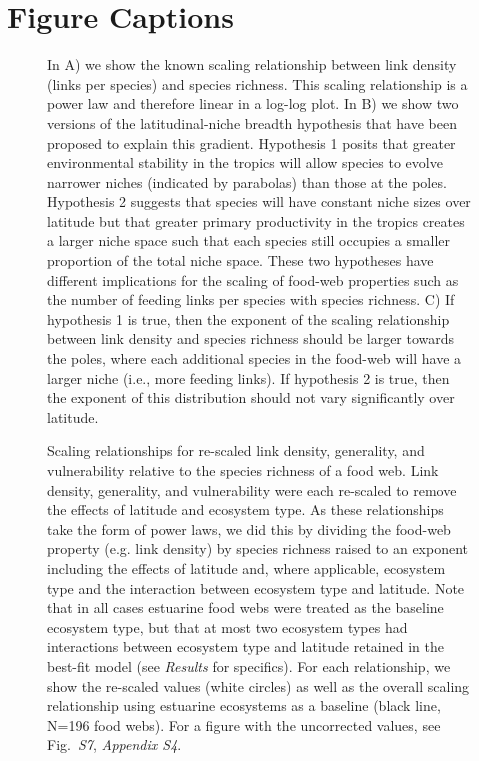 \documentclass[12pt]{article}
\begin{document}
\section*{Figure Captions}

\begin{figure}[h]
\caption{In A) we show the known scaling relationship between link density (links per species) and 
species richness. This scaling relationship is a power law and therefore linear in a log-log plot.
In B) we show two versions of the latitudinal-niche breadth hypothesis that have been proposed to
explain this gradient. Hypothesis 1 posits that greater environmental stability in the tropics will 
allow species to evolve narrower niches (indicated by parabolas) than those at the poles. Hypothesis 2 
suggests that species will have constant niche sizes over latitude but that greater primary productivity 
in the tropics creates a larger niche space such that each species still occupies a smaller proportion 
of the total niche space. These two hypotheses have different implications for the scaling of food-web 
properties such as the number of feeding links per species with species richness. C) If hypothesis 1 is 
true, then the exponent of the scaling relationship between link density and species richness should 
be larger towards the poles, where each additional species in the food-web will have a larger niche 
(i.e., more feeding links). If hypothesis 2 is true, then the exponent of this distribution should 
not vary significantly over latitude.}
\label{concept}
\end{figure}


\begin{figure}[h]
\caption{Scaling relationships for re-scaled link density, generality, and vulnerability 
relative to the species richness of a food web. Link density, generality,
and vulnerability were each re-scaled to remove the effects of latitude and ecosystem
type. As these relationships take the form of power laws, we did this by dividing the food-web
property (e.g. link density) by species richness raised to an exponent including the 
effects of latitude and, where applicable, ecosystem type and the interaction between ecosystem
type and latitude. Note that in all cases estuarine food webs were treated as the baseline 
ecosystem type, but that at most two ecosystem types had interactions between ecosystem type and
latitude retained in the best-fit model (see \emph{Results} for specifics). For each relationship, 
we show the re-scaled values (white circles) as well as the overall scaling relationship using estuarine
ecosystems as a baseline (black line, N=196 food webs). For a figure with the uncorrected values,
see Fig.~\emph{S7}, \emph{Appendix S4}.}
\label{props_v_lat}
\end{figure}
\end{document}
